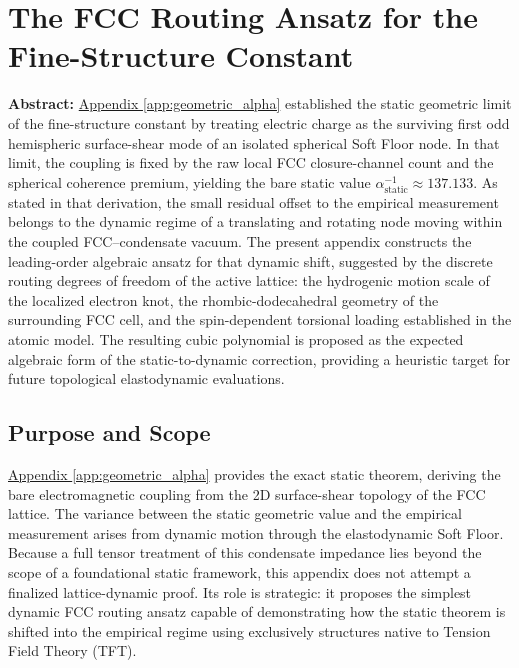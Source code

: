 \chapter{The FCC Routing Ansatz for the Fine-Structure Constant}
\label{app:dynamic_alpha}

\noindent\textbf{Abstract:} \hyperref[app:geometric_alpha]{Appendix \ref*{app:geometric_alpha}} established the static geometric limit of the fine-structure constant by treating electric charge as the surviving first odd hemispheric surface-shear mode of an isolated spherical Soft Floor node. In that limit, the coupling is fixed by the raw local FCC closure-channel count and the spherical coherence premium, yielding the bare static value $\alpha_{\mathrm{static}}^{-1} \approx 137.133$. As stated in that derivation, the small residual offset to the empirical measurement belongs to the dynamic regime of a translating and rotating node moving within the coupled FCC–condensate vacuum. The present appendix constructs the leading-order algebraic ansatz for that dynamic shift, suggested by the discrete routing degrees of freedom of the active lattice: the hydrogenic motion scale of the localized electron knot, the rhombic-dodecahedral geometry of the surrounding FCC cell, and the spin-dependent torsional loading established in the atomic model. The resulting cubic polynomial is proposed as the expected algebraic form of the static-to-dynamic correction, providing a heuristic target for future topological elastodynamic evaluations.

\section{Purpose and Scope}
\hyperref[app:geometric_alpha]{Appendix \ref*{app:geometric_alpha}} provides the exact static theorem, deriving the bare electromagnetic coupling from the 2D surface-shear topology of the FCC lattice. The variance between the static geometric value and the empirical measurement arises from dynamic motion through the elastodynamic Soft Floor. Because a full tensor treatment of this condensate impedance lies beyond the scope of a foundational static framework, this appendix does not attempt a finalized lattice-dynamic proof. Its role is strategic: it proposes the simplest dynamic FCC routing ansatz capable of demonstrating how the static theorem is shifted into the empirical regime using exclusively structures native to Tension Field Theory (TFT).

